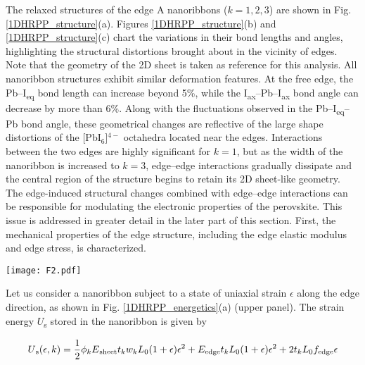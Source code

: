 \documentclass[aps,prl,preprint,11pt,superscriptaddress,bibnotes,amsmath,amssymb,amsfonts,showkeys]{revtex4-2}
\begin{document}
The relaxed structures of the edge A nanoribbons ($k = 1, 2, 3$) are shown in Fig. \ref{1DHRPP_structure}(a). Figures \ref{1DHRPP_structure}(b) and \ref{1DHRPP_structure}(c) chart the variations in their bond lengths and angles, highlighting the structural distortions brought about in the vicinity of edges. Note that the geometry of the 2D sheet is taken as reference for this analysis. All nanoribbon structures exhibit similar deformation features. At the free edge, the Pb--I\textsubscript{eq} bond length can increase beyond 5\%, while the I\textsubscript{ax}--Pb--I\textsubscript{ax} bond angle can decrease by more than 6\%. Along with the fluctuations observed in the Pb--I\textsubscript{eq}--Pb bond angle, these geometrical changes are reflective of the large shape distortions of the [PbI$_6$]$^{4-}$ octahedra located near the edges. Interactions between the two edges are highly significant for $k = 1$, but as the width of the nanoribbon is increased to $k = 3$, edge--edge interactions gradually dissipate and the central region of the structure begins to retain its 2D sheet-like geometry. The edge-induced structural changes combined with edge--edge interactions can be responsible for modulating the electronic properties of the perovskite. This issue is addressed in greater detail in the later part of this section. First, the mechanical properties of the edge structure, including the edge elastic modulus and edge stress, is characterized.

\begin{figure*}
\texttt{[image: F2.pdf]}
\caption{(a) Relaxed structures of monolayer (BA)$_2$PbI$_4$ nanoribbons (side view) of width index $k$. Edge-induced distortions in the (b) bond lengths and (c) bond angles across $k$ = 1 (red), $k$ = 2 (green), and $k$ = 3 (blue) nanoribbons. The geometry of the 2D sheet is taken as reference and the grey-shaded regions denote the $\pm$1\% window of fluctuation. \label{1DHRPP_structure}}
\end{figure*}

Let us consider a nanoribbon subject to a state of uniaxial strain $\epsilon$ along the edge direction, as shown in Fig. \ref{1DHRPP_energetics}(a) (upper panel). The strain energy $U$\textsubscript{s} stored in the nanoribbon is given by

{\begin{align}\label{Us}
U\textsubscript{s} (\epsilon, k) = \frac{1}{2}\phi_{k}E\textsubscript{sheet}t_{k}w_{k}L_{0}(1+\epsilon)\epsilon^{2} + E_{\text{edge}}t_{k}L_{0}(1+\epsilon)\epsilon^{2} + 2t_{k}L_{0}f_{\text{edge}}\epsilon
\end{align}}
\end{document}
